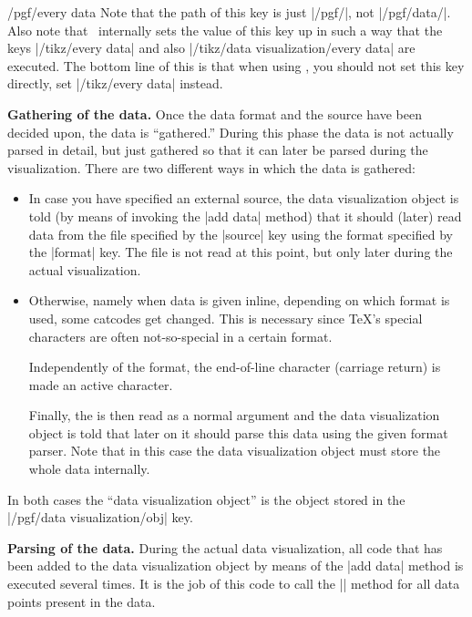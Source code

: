 \begin{command}{\pgfdata{}}
\begin{stylekey}{/pgf/every data}
    Note that the path of this key is just |/pgf/|, not
    |/pgf/data/|. Also note that \tikzname\ internally sets the value
    of this key up in such a way that the keys |/tikz/every data| and
    also |/tikz/data visualization/every data| are executed. The
    bottom line of this is that when using \tikzname, you should not
    set this key directly, set |/tikz/every data| instead.
  \end{stylekey}
  
  \medskip
  \textbf{Gathering of the data.}
  Once the data format and the source have been decided upon, the data
  is ``gathered.'' During this phase the data is not actually parsed
  in detail, but just gathered so that it can later be parsed during
  the visualization. There are two different ways in which the data is
  gathered:
  \begin{itemize}
  \item In case you have specified an external source, the data
    visualization object is told (by means of invoking the |add data|
    method) that it should (later) read data from  the file specified
    by the |source| key using the format specified 
    by the |format| key. The file is not read at this point, but only
    later during the actual visualization.
  \item Otherwise, namely when data is given inline, depending on
    which format is used, some catcodes get changed. This is necessary
    since \TeX's special characters are often not-so-special in a
    certain format.

    Independently of the format, the end-of-line character
    (carriage return) is made an active character.

    Finally, the  is then read as a normal argument
    and the data visualization object is told that later on it should
    parse this data using the given format parser. Note that in this
    case the data visualization object must store the whole data
    internally. 
  \end{itemize}
  In both cases the ``data visualization object'' is the object stored
  in the |/pgf/data visualization/obj| key.

  \medskip
  \textbf{Parsing of the data.}
  During the actual data visualization, all code that has been added
  to the data visualization object by means of the |add data| method
  is executed several times. It is the job of this code to call the
  |\pgfdatapoint| method for all data points present in the data.


\end{command}
